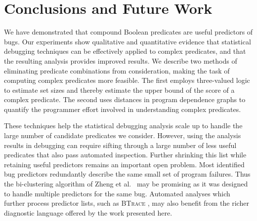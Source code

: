
\section{Conclusions and Future Work}
\label{sec-conclusion}
We have demonstrated that compound Boolean predicates are useful
predictors of bugs.  Our experiments show qualitative and quantitative
evidence that statistical debugging techniques can be effectively
applied to complex predicates, and that the resulting analysis
provides improved results.  We describe two methods of eliminating
predicate combinations from consideration, making the task of
computing complex predicates more feasible.  The first employs
three-valued logic to estimate set sizes and thereby estimate the
upper bound of the score of a complex predicate.  The second uses
distances in program dependence graphs to quantify the programmer
effort involved in understanding complex predicates.

These techniques help the statistical debugging analysis scale up to
handle the large number of candidate predicates we consider.  However,
using the analysis results in debugging can require sifting through a
large number of less useful predicates that also pass automated
inspection.  Further shrinking this list while retaining useful
predictors remains an important open problem.  Most identified bug
predictors redundantly describe the same small set of program
failures.  Thus the bi-clustering algorithm of Zheng et al.\
\cite{Zheng:2006:SDSIMB} may be promising as it was designed to handle
multiple predictors for the same bug.  Automated analyses which
further process predictor lists, such as \textsc{BTrace}
\cite{Lal:2006:POPAD}, may also benefit from the richer diagnostic
language offered by the work presented here.

